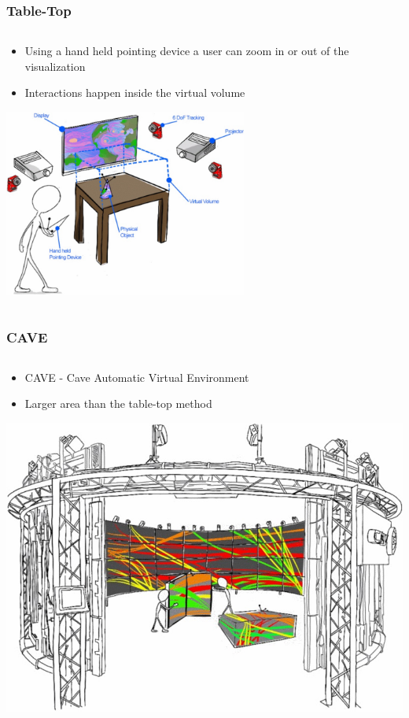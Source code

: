 \documentclass{beamer}
\begin{document}
\begin{frame}
\frametitle{Table-Top} 
	\begin{columns}
    \begin{column}{0.9\textwidth}
    \begin{itemize}
		\item Using a hand held pointing device a user can zoom in or out of the visualization 
		\item Interactions happen inside the virtual volume
	\end{itemize}
	\begin{center}
	\includegraphics[width=8cm]{../Sample_paper/images/Tabletop}
	\end{center}
	\end{column}
    \end{columns}
\end{frame}

\begin{frame}
\frametitle{CAVE}
	\begin{columns}
    \begin{column}{0.7\textwidth}
    \begin{itemize}
		\item CAVE - Cave Automatic Virtual Environment 
		\item Larger area than the table-top method
	\end{itemize}
	\includegraphics[width=\textwidth]{../Sample_paper/images/CAVE}	
	\end{column}
    \end{columns}
\end{frame}
\end{document}
